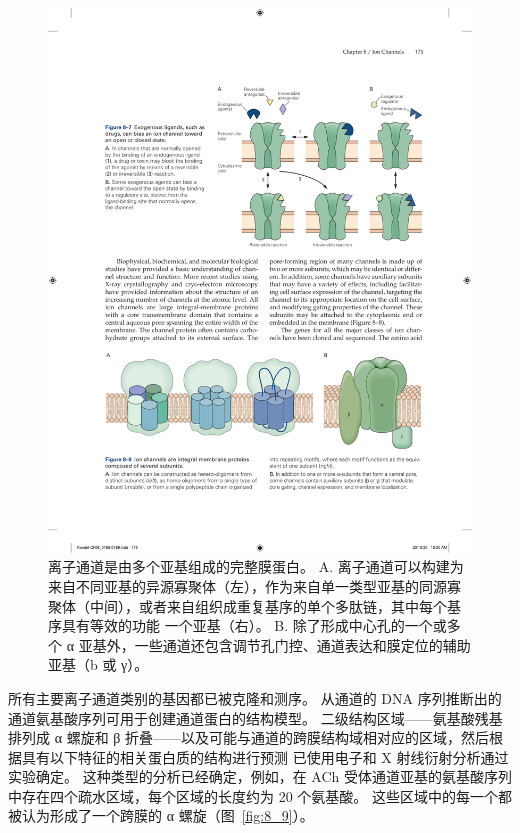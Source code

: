 \begin{figure}[htbp]
	\centering
	\includegraphics[width=1.0\linewidth]{chap08/fig_8_8}
	\caption{离子通道是由多个亚基组成的完整膜蛋白。 A. 离子通道可以构建为来自不同亚基的异源寡聚体（左），作为来自单一类型亚基的同源寡聚体（中间），或者来自组织成重复基序的单个多肽链，其中每个基序具有等效的功能 一个亚基（右）。 B. 除了形成中心孔的一个或多个 α 亚基外，一些通道还包含调节孔门控、通道表达和膜定位的辅助亚基（b 或 γ）。}
	\label{fig:8_8}
\end{figure}


所有主要离子通道类别的基因都已被克隆和测序。
从通道的 DNA 序列推断出的通道氨基酸序列可用于创建通道蛋白的结构模型。 
二级结构区域——氨基酸残基排列成 α 螺旋和 β 折叠——以及可能与通道的跨膜结构域相对应的区域，然后根据具有以下特征的相关蛋白质的结构进行预测 已使用电子和 X 射线衍射分析通过实验确定。
这种类型的分析已经确定，例如，在 ACh 受体通道亚基的氨基酸序列中存在四个疏水区域，每个区域的长度约为 20 个氨基酸。
这些区域中的每一个都被认为形成了一个跨膜的 α 螺旋（图~\ref{fig:8_9}）。


